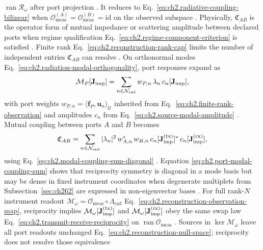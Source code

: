 \(\operatorname{ran}\mathcal{R}_\omega\) after port projection \cite{stratton1941}. It reduces
to Eq.~\eqref{eq:ch2.radiative-coupling-bilinear} when
\(\mathcal{O}_{\mathrm{meas}}^{(A)}=\mathcal{O}_{\mathrm{meas}}^{(B)}=\mathrm{id}\) on the
observed subspace \cite{stratton1941}. Physically, \(\mathfrak{C}_{AB}\) is the
operator form of mutual impedance or scattering amplitude between declared ports when regime qualification
Eq.~\eqref{eq:ch2.regime-component-criterion} is satisfied \cite{harrington2001}. Finite
rank Eq.~\eqref{eq:ch2.reconstruction-rank-cap} limits the number of independent entries
\(\mathfrak{C}_{AB}\) can resolve \cite{stratton1941}.
On orthonormal modes Eq.~\eqref{eq:ch2.radiation-modal-orthogonality}, port responses expand as
\begin{equation}
\label{eq:ch2.port-modal-response-expansion}
\mathcal{M}_P[\mathbf{J}_{\mathrm{imp}}]
=
\sum_{n\in\mathcal{N}_{\mathrm{rad}}}
w_{P,n}\,\lambda_n\,c_n[\mathbf{J}_{\mathrm{imp}}],
\end{equation}
with port weights \(w_{P,n}=\langle \mathbf{f}_P,\mathbf{u}_n\rangle_{\mathcal{U}}\) inherited
from Eq.~\eqref{eq:ch2.finite-rank-observation} and amplitudes \(c_n\) from
Eq.~\eqref{eq:ch2.source-modal-amplitude} \cite{stratton1941}. Mutual coupling
between ports \(A\) and \(B\) becomes
\begin{equation}
\label{eq:ch2.port-modal-coupling-sum}
\mathfrak{C}_{AB}
=
\sum_{n\in\mathcal{N}_{\mathrm{rad}}}
|\lambda_n|^{2}\,w_{A,n}^{*}\,w_{B,n}\,
c_n[\mathbf{J}_{\mathrm{imp}}^{\mathrm{(tx)}}]^{*}\,c_n[\mathbf{J}_{\mathrm{imp}}^{\mathrm{(rx)}}],
\end{equation}
using Eq.~\eqref{eq:ch2.modal-coupling-sum-diagonal} \cite{stratton1941}. Equation
\eqref{eq:ch2.port-modal-coupling-sum} shows that reciprocity symmetry is diagonal in a mode
basis but may be dense in fixed instrument coordinates when degenerate multiplets from
Subsection~\ref{sec:ch262} are expressed in non-eigenvector bases
\cite{harrington2001}.
\label{prop:ch2.measurement-reciprocity}
For full rank-$N$ instrument readout \(\mathcal{M}_\omega=\mathcal{O}_{\mathrm{meas}}\circ\Lambda_{\mathrm{rad}}\)
Eq.~\eqref{eq:ch2.reconstruction-observation-map}, reciprocity implies
\(\mathcal{M}_\omega[\mathbf{J}_{\mathrm{imp}}^{\mathrm{(tx)}}]\) and \(\mathcal{M}_\omega[\mathbf{J}_{\mathrm{imp}}^{\mathrm{(rx)}}]\)
obey the same swap law Eq.~\eqref{eq:ch2.transmit-receive-reciprocity} on
\(\operatorname{ran}\mathcal{O}_{\mathrm{meas}}\) \cite{stratton1941}. Sources
in \(\ker\mathcal{M}_\omega\) leave all port readouts unchanged
Eq.~\eqref{eq:ch2.reconstruction-null-space}; reciprocity does not resolve those equivalence
